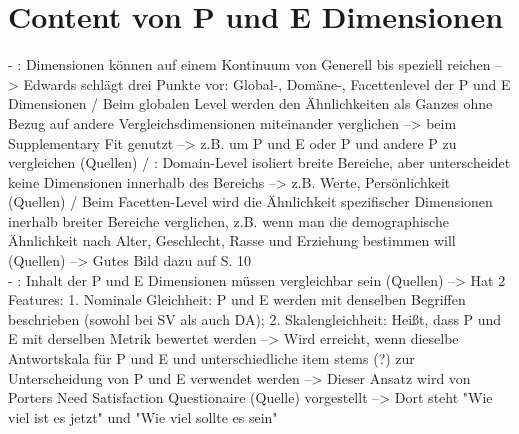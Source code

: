 \section{Content von P und E Dimensionen}
\label{ch:notizen:contentVonPundEDimensionen}
- \cite[S. 6]{edwards:2007}: Dimensionen können auf einem Kontinuum von Generell bis speziell reichen --> Edwards schlägt drei Punkte vor: Global-, Domäne-, Facettenlevel der P und E Dimensionen / Beim globalen Level werden den Ähnlichkeiten als Ganzes ohne Bezug auf andere Vergleichsdimensionen miteinander verglichen --> beim Supplementary Fit genutzt --> z.B. um P und E oder P und andere P zu vergleichen (Quellen) / \cite[S. 7]{edwards:2007}: Domain-Level  isoliert breite Bereiche, aber unterscheidet keine Dimensionen innerhalb des Bereichs --> z.B. Werte, Persönlichkeit (Quellen) / Beim Facetten-Level wird die Ähnlichkeit spezifischer Dimensionen inerhalb breiter Bereiche verglichen, z.B. wenn man die demographische Ähnlichkeit nach Alter, Geschlecht, Rasse und Erziehung bestimmen will (Quellen) --> Gutes Bild dazu auf S. 10 \\
- \cite[S. 7]{edwards:2007}: Inhalt der P und E Dimensionen müssen vergleichbar sein (Quellen) --> Hat 2 Features: 1. Nominale Gleichheit: P und E werden mit denselben Begriffen beschrieben (sowohl bei SV als auch DA); 2. Skalengleichheit: Heißt, dass P und E mit derselben Metrik bewertet werden \cite{copingAndAdaption:1974} --> Wird erreicht, wenn dieselbe Antwortskala für P und E und unterschiedliche item stems (?) zur Unterscheidung von P und E verwendet werden --> Dieser Ansatz wird von Porters Need Satisfaction Questionaire (Quelle) vorgestellt --> Dort steht "Wie viel ist es jetzt" und "Wie viel sollte es sein"


